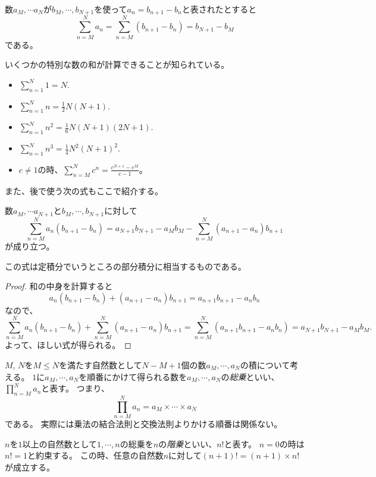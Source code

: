\begin{proposition}
数$a_M, \cdots a_N$が$b_M, \cdots, b_{N+1}$を使って$a_n = b_{n+1}-b_n$と表されたとすると
$$
\sum_{n = M}^N a_n = \sum_{n = M}^N(b_{n+1}-b_n) = b_{N+1}-b_M
$$
である。
\end{proposition}

いくつかの特別な数の和が計算できることが知られている。

\begin{proposition}[和の公式]
\begin{itemize}
\item
$\sum_{n = 1}^N 1 = N$.
\item
$\sum_{n = 1}^N n = \frac{1}{2}N(N+1)$.
\item
$\sum_{n = 1}^N n^2 = \frac{1}{6}N(N+1)(2 N+1)$.
\item
$\sum_{n = 1}^N n^3 = \frac{1}{4}N^2(N+1)^2$.
\item
$c \ne 1$の時、$\sum_{n = M}^N c^n = \frac{c^{N+1}-c^M}{c-1}$。
\end{itemize}
\end{proposition}

また、後で使う次の式もここで紹介する。

\begin{proposition}[部分和分]
\label{t_sum_part}
数$a_M, \cdots a_{N+1}$と$b_M, \cdots, b_{N+1}$に対して
$$
\sum_{n = M}^N a_n(b_{n+1}-b_n) = a_{N+1}b_{N+1}-a_M b_M-\sum_{n = M}^N (a_{n+1}-a_n)b_{n+1}
$$
が成り立つ。
\end{proposition}

この式は定積分でいうところの部分積分に相当するものである。

\begin{proof}
和の中身を計算すると
$$
a_n(b_{n+1}-b_n)+(a_{n+1}-a_n)b_{n+1} = a_{n+1}b_{n+1}-a_n b_n
$$
なので、
$$
\sum_{n = M}^N a_n(b_{n+1}-b_n)+\sum_{n = M}^N (a_{n+1}-a_n)b_{n+1} = \sum_{n = M}^N (a_{n+1}b_{n+1}-a_n b_n) = a_{N+1}b_{N+1}-a_M b_M.
$$
よって、ほしい式が得られる。
\end{proof}

$M$, $N$を$M \le N$を満たす自然数として$N-M+1$個の数$a_M, \cdots, a_N$の積について考える。
$1$に$a_M, \cdots, a_N$を順番にかけて得られる数を$a_M, \cdots, a_N$の\emph{総乗}といい、$\prod_{n = M}^N a_n$と表す。
つまり、
$$
\prod_{n = M}^N a_n = a_M\times\cdots\times a_N
$$
である。
実際には乗法の結合法則と交換法則よりかける順番は関係ない。

$n$を$1$以上の自然数として$1, \cdots, n$の総乗を$n$の\emph{階乗}といい、$n!$と表す。
$n = 0$の時は$n! = 1$と約束する。
この時、任意の自然数$n$に対して$(n+1)! = (n+1)\times n!$が成立する。

